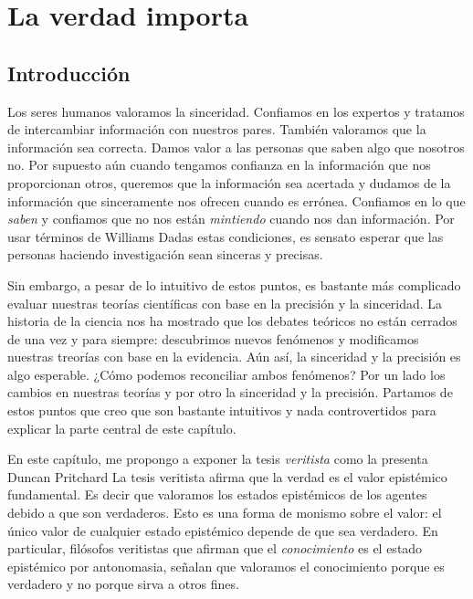 




\chapter{La verdad importa}
\label{ch:truthmatter}

\section{Introducción}

Los seres humanos valoramos la sinceridad.
Confiamos en los expertos y tratamos de intercambiar información con nuestros pares.
También valoramos que la información sea correcta.
Damos valor a las personas que saben algo que nosotros no.
Por supuesto aún cuando tengamos confianza en la información que nos proporcionan otros, queremos que la información sea acertada y dudamos de la información que sinceramente nos ofrecen cuando es errónea.
Confiamos en lo que \emph{saben} y confiamos que no nos están \emph{mintiendo} cuando nos dan información.
Por usar términos de Williams %
Dadas estas condiciones, es sensato esperar que las personas haciendo investigación sean sinceras y precisas.

Sin embargo, a pesar de lo intuitivo de estos puntos, es bastante más complicado evaluar nuestras teorías científicas con base en la precisión y la sinceridad.
La historia de la ciencia nos ha mostrado que los debates teóricos no están cerrados de una vez y para siempre: descubrimos nuevos fenómenos y modificamos nuestras treorías con base en la evidencia.
Aún así, la sinceridad y la precisión es algo esperable.
¿Cómo podemos reconciliar ambos fenómenos?
Por un lado los cambios en nuestras teorías y por otro la sinceridad y la precisión.
Partamos de estos puntos que creo que son bastante intuitivos y nada controvertidos para explicar la parte central de este capítulo.

En este capítulo, me propongo a exponer la tesis \textit{veritista} como la presenta Duncan Pritchard %
La tesis veritista afirma que la verdad es el valor epistémico fundamental.
Es decir que valoramos los estados epistémicos de los agentes debido a que son verdaderos.
Esto es una forma de monismo sobre el valor: el único valor de cualquier estado epistémico depende de que sea verdadero.
En particular, filósofos veritistas que afirman que el \emph{conocimiento} es el estado epistémico por antonomasia, señalan que valoramos el conocimiento porque es verdadero y no porque sirva a otros fines.

